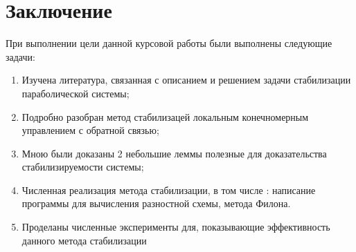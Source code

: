 \section{Заключение}
\vspace{1em}
При выполнении цели данной курсовой работы были выполнены следующие задачи:
\begin{enumerate}
	\item Изучена литература, связанная с описанием и решением задачи стабилизации параболической системы;
	\item Подробно разобран метод стабилизацей локальным конечномерным управлением с обратной связью;
	\item Мною были доказаны 2 небольшие леммы полезные для доказательства стабилизируемости системы;
	\item Численная реализация метода стабилизации, в том числе : написание программы для вычисления разностной схемы, метода Филона.
	\item Проделаны численные эксперименты для, показывающие эффективность данного метода стабилизации
\end{enumerate}
